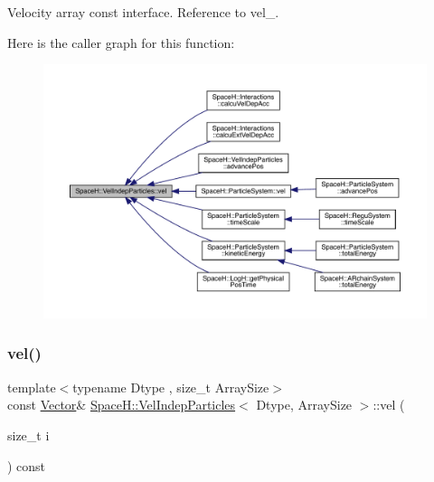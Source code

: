 Velocity array const interface. Reference to vel\+\_\+. 

Here is the caller graph for this function\+:
\nopagebreak
\begin{figure}[H]
\begin{center}
\leavevmode
\includegraphics[width=350pt]{class_space_h_1_1_vel_indep_particles_a3c096b30a541cd468d6fe5f9d138b3e5_icgraph}
\end{center}
\end{figure}
\mbox{\label{class_space_h_1_1_vel_indep_particles_acb67afe21a29e02dd8852a31e4611905}} 
\subsubsection{\texorpdfstring{vel()}{vel()}\hspace{0.1cm}{\footnotesize\ttfamily [2/2]}}
{\footnotesize\ttfamily template$<$typename Dtype , size\+\_\+t Array\+Size$>$ \\
const \mbox{\hyperlink{class_space_h_1_1_vel_indep_particles_a61bbcfdb0dc7f99f3c68af69a755c935}{Vector}}\& \mbox{\hyperlink{class_space_h_1_1_vel_indep_particles}{Space\+H\+::\+Vel\+Indep\+Particles}}$<$ Dtype, Array\+Size $>$\+::vel (\begin{DoxyParamCaption}\item[{size\+\_\+t}]{i }\end{DoxyParamCaption}) const\hspace{0.3cm}{\ttfamily [inline]}}



